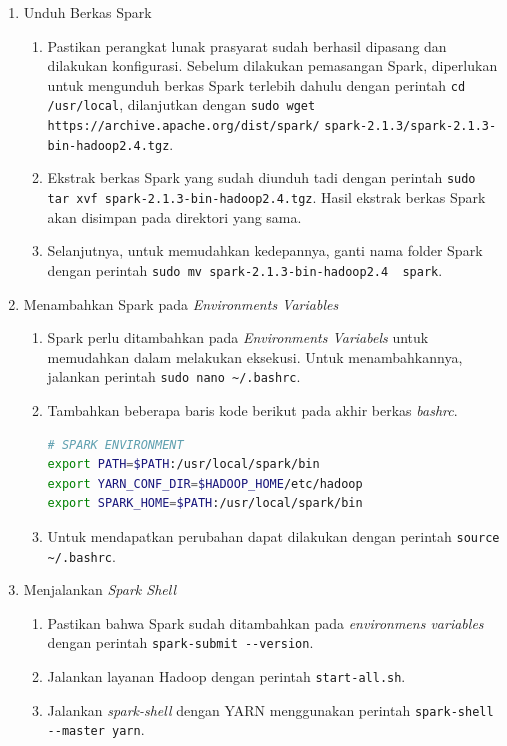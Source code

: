 \begin{enumerate}
  \item Unduh Berkas Spark
  \begin{enumerate}
    \item Pastikan perangkat lunak prasyarat sudah berhasil dipasang dan dilakukan konfigurasi. Sebelum dilakukan pemasangan Spark, diperlukan untuk mengunduh berkas Spark terlebih dahulu dengan perintah \verb|cd /usr/local|, dilanjutkan dengan \verb|sudo wget https://archive.apache.org/dist/spark/|
    \newline \verb|spark-2.1.3/spark-2.1.3-bin-hadoop2.4.tgz|.    
    \item Ekstrak berkas Spark yang sudah diunduh tadi dengan perintah \verb|sudo tar xvf spark-2.1.3-bin-hadoop2.4.tgz|. Hasil ekstrak berkas Spark akan disimpan pada direktori yang sama.
    \item Selanjutnya, untuk memudahkan kedepannya, ganti nama folder Spark dengan perintah \verb|sudo mv spark-2.1.3-bin-hadoop2.4  spark|. 
  \end{enumerate}
  \item Menambahkan Spark pada \textit{Environments Variables}
  \begin{enumerate}
    \item Spark perlu ditambahkan pada \textit{Environments Variabels} untuk memudahkan dalam melakukan eksekusi. Untuk menambahkannya, jalankan perintah \verb|sudo nano ~/.bashrc|.
    \item Tambahkan beberapa baris kode berikut pada akhir berkas \textit{bashrc}.
      \begin{lstlisting}[language=bash]
# SPARK ENVIRONMENT
export PATH=$PATH:/usr/local/spark/bin
export YARN_CONF_DIR=$HADOOP_HOME/etc/hadoop
export SPARK_HOME=$PATH:/usr/local/spark/bin
      \end{lstlisting}
    \item Untuk mendapatkan perubahan dapat dilakukan dengan perintah \verb|source ~/.bashrc|.
  \end{enumerate}
  \item Menjalankan \textit{Spark Shell}
  \begin{enumerate}
    \item Pastikan bahwa Spark sudah ditambahkan pada \textit{environmens variables} dengan perintah \verb|spark-submit --version|.
    \item Jalankan layanan Hadoop dengan perintah \verb|start-all.sh|.
    \item Jalankan \textit{spark-shell} dengan YARN menggunakan perintah \verb|spark-shell --master yarn|.
  \end{enumerate}
\end{enumerate}


